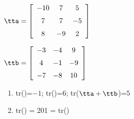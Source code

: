 {$\tta = \left[ \begin {array}{ccc} -10&7&5\\\noalign{\medskip}7&7&-5
\\\noalign{\medskip}8&-9&2\end {array} \right]$
 
$\ttb = \left[ \begin {array}{ccc} -3&-4&9\\\noalign{\medskip}4&-1&-9
\\\noalign{\medskip}-7&-8&10\end {array} \right]$
} 
{\begin{enumerate}
\item tr(\tta)=$-1$; tr(\ttb)=$6$; tr($\tta+\ttb$)=$5$
\item	tr(\tta\ttb) = 201 = tr(\ttb\tta)
\end{enumerate}
}


  

